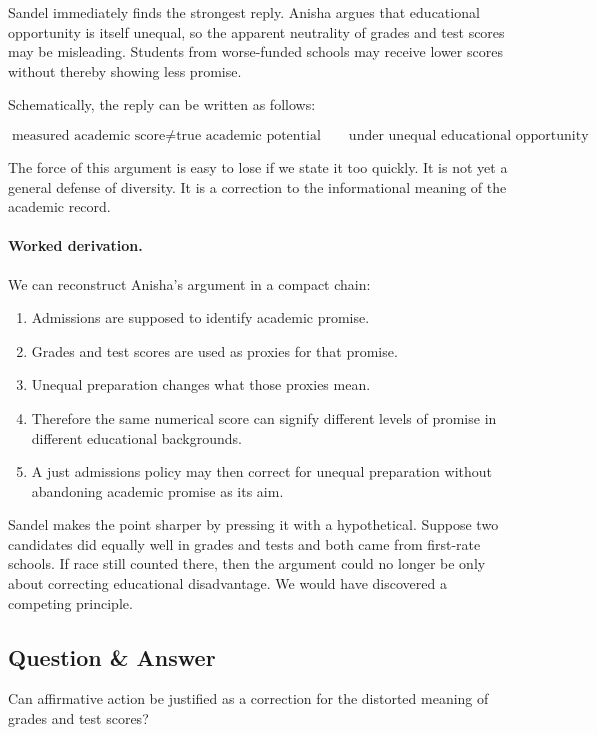 Sandel immediately finds the strongest reply. Anisha argues that educational opportunity is itself unequal, so the apparent neutrality of grades and test scores may be misleading. Students from worse-funded schools may receive lower scores without thereby showing less promise.

Schematically, the reply can be written as follows:

\begin{equation}
\text{measured academic score} \neq \text{true academic potential}
\qquad
\text{under unequal educational opportunity}
\end{equation}

The force of this argument is easy to lose if we state it too quickly. It is not yet a general defense of diversity. It is a correction to the informational meaning of the academic record.

\paragraph{Worked derivation.}
We can reconstruct Anisha's argument in a compact chain:
\begin{enumerate}
\item Admissions are supposed to identify academic promise.
\item Grades and test scores are used as proxies for that promise.
\item Unequal preparation changes what those proxies mean.
\item Therefore the same numerical score can signify different levels of promise in different educational backgrounds.
\item A just admissions policy may then correct for unequal preparation without abandoning academic promise as its aim.
\end{enumerate}

Sandel makes the point sharper by pressing it with a hypothetical. Suppose two candidates did equally well in grades and tests and both came from first-rate schools. If race still counted there, then the argument could no longer be only about correcting educational disadvantage. We would have discovered a competing principle.

\subsection{Question \& Answer}

Can affirmative action be justified as a correction for the distorted meaning of grades and test scores?

